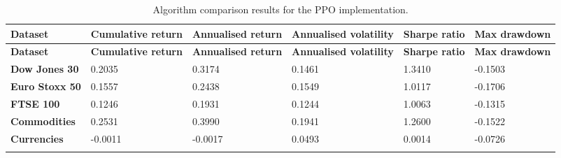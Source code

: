 \begin{longtable}{|l|p{2.1cm}|p{2.1cm}|p{2.1cm}|p{1.5cm}|p{2cm}|}
    \hline
    \textbf{Dataset} & \textbf{Cumulative return} & \textbf{Annualised return} & \textbf{Annualised volatility} & \textbf{Sharpe ratio} & \textbf{Max drawdown}  \\ \midrule
    \endfirsthead

    \hline
    \textbf{Dataset} & \textbf{Cumulative return} & \textbf{Annualised return} & \textbf{Annualised volatility} & \textbf{Sharpe ratio} & \textbf{Max drawdown}  \\ \midrule
    \endhead

    \endfoot
    \hline

    \textbf{Dow Jones 30} & 0.2035 & 0.3174 & 0.1461 & 1.3410 & -0.1503 \\ \hline
    \textbf{Euro Stoxx 50} & 0.1557 & 0.2438 & 0.1549 & 1.0117 & -0.1706 \\ \hline
    \textbf{FTSE 100} & 0.1246 & 0.1931 & 0.1244 & 1.0063 & -0.1315 \\ \hline
    \textbf{Commodities} & 0.2531 & 0.3990 & 0.1941 & 1.2600 & -0.1522 \\ \hline
    \textbf{Currencies} & -0.0011 & -0.0017 & 0.0493 & 0.0014 & -0.0726 \\ \hline

    \caption{Algorithm comparison results for the PPO implementation.}
    \label{tab:experiment_algorithms_ppo}
\end{longtable}
